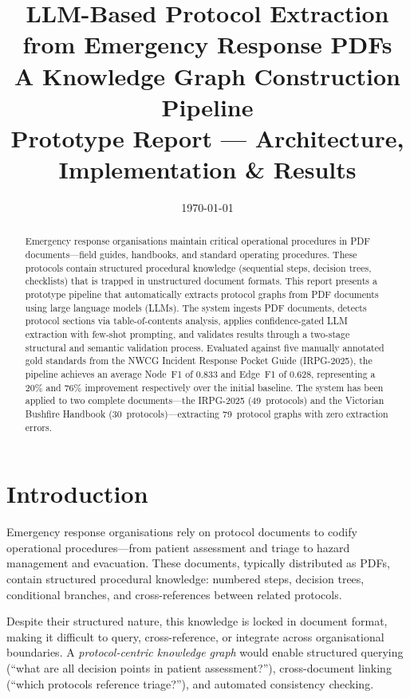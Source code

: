 \documentclass[12pt,a4paper]{article}
\title{%
    \vspace{-1cm}
    \textbf{LLM-Based Protocol Extraction from Emergency Response PDFs}\\[0.4em]
    \large A Knowledge Graph Construction Pipeline\\[0.2em]
    \normalsize Prototype Report --- Architecture, Implementation \& Results
}
\author{}
\date{\today}
\begin{document}
\maketitle
\thispagestyle{empty}

\begin{abstract}
Emergency response organisations maintain critical operational procedures in PDF documents---field guides, handbooks, and standard operating procedures. These protocols contain structured procedural knowledge (sequential steps, decision trees, checklists) that is trapped in unstructured document formats. This report presents a prototype pipeline that automatically extracts protocol graphs from PDF documents using large language models (LLMs). The system ingests PDF documents, detects protocol sections via table-of-contents analysis, applies confidence-gated LLM extraction with few-shot prompting, and validates results through a two-stage structural and semantic validation process. Evaluated against five manually annotated gold standards from the NWCG Incident Response Pocket Guide (IRPG-2025), the pipeline achieves an average Node~F1 of 0.833 and Edge~F1 of 0.628, representing a 20\% and 76\% improvement respectively over the initial baseline. The system has been applied to two complete documents---the IRPG-2025 (49~protocols) and the Victorian Bushfire Handbook (30~protocols)---extracting 79~protocol graphs with zero extraction errors.
\end{abstract}

\tableofcontents
\newpage

\section{Introduction}
\label{sec:introduction}

Emergency response organisations rely on protocol documents to codify operational procedures---from patient assessment and triage to hazard management and evacuation. These documents, typically distributed as PDFs, contain structured procedural knowledge: numbered steps, decision trees, conditional branches, and cross-references between related protocols.

Despite their structured nature, this knowledge is locked in document format, making it difficult to query, cross-reference, or integrate across organisational boundaries. A \emph{protocol-centric knowledge graph} would enable structured querying (``what are all decision points in patient assessment?''), cross-document linking (``which protocols reference triage?''), and automated consistency checking.
\end{document}

